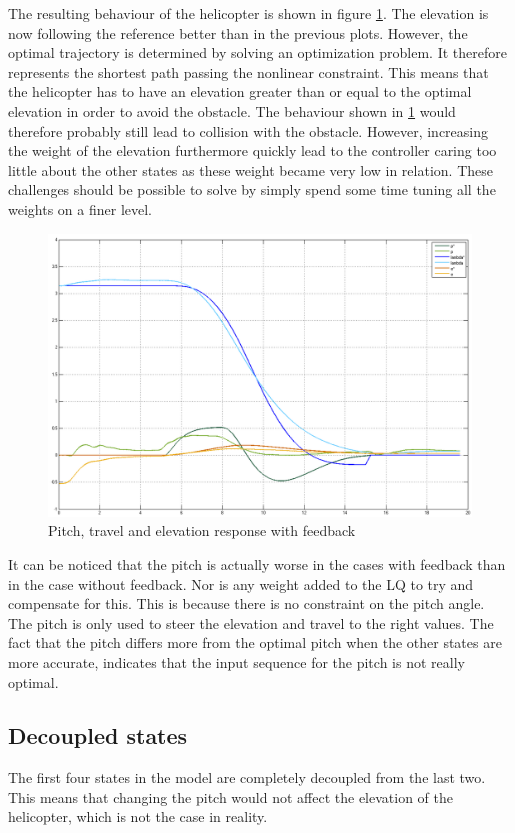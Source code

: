 \documentclass[a4paper, 12pt]{article}\usepackage[utf8]{inputenc}
\begin{document}
The resulting behaviour of the helicopter is shown in figure \ref{fig:plot_4.3}.  The elevation is now following the reference better than in the previous plots. However, the optimal trajectory is determined by solving an optimization problem. It therefore represents the shortest path passing the nonlinear constraint. This means that the helicopter has to have an elevation greater than or equal to the optimal elevation in order to avoid the obstacle. The behaviour shown in \ref{fig:plot_4.3} would therefore probably still lead to collision with the obstacle. However, increasing the weight of the elevation furthermore quickly lead to the controller caring too little about the other states as these weight became very low in relation. These challenges should be possible to solve by simply spend some time tuning all the weights on a finer level.

\begin{figure}[h!]
    \centering
    \includegraphics[width=150mm]{Part4/with_feedback_better_tuning.PNG}
    \caption{Pitch, travel and elevation response with feedback}
    \label{fig:plot_4.3}
\end{figure}

It can be noticed that the pitch is actually worse in the cases with feedback than in the case without feedback. Nor is any weight added to the LQ to try and compensate for this. This is because there is no constraint on the pitch angle. The pitch is only used to steer the elevation and travel to the right values. The fact that the pitch differs more from the optimal pitch when the other states are more accurate, indicates that the input sequence for the pitch is not really optimal.


\subsection{Decoupled states}
The first four states in the model are completely decoupled from the last two. This means that changing the pitch would not affect the elevation of the helicopter, which is not the case in reality.
\end{document}
